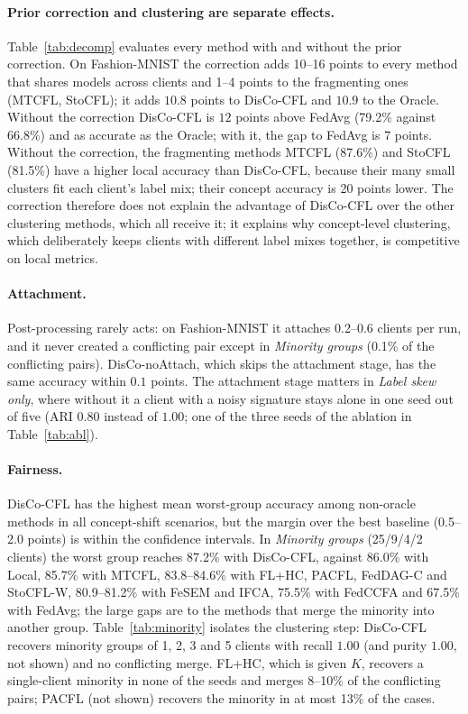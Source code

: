 \paragraph{Prior correction and clustering are separate effects.} Table~\ref{tab:decomp} evaluates every method with and without the prior correction. On Fashion-MNIST the correction adds 10--16 points to every method that shares models across clients and 1--4 points to the fragmenting ones (MTCFL, StoCFL); it adds $10.8$ points to DisCo-CFL and $10.9$ to the Oracle. Without the correction DisCo-CFL is $12$ points above FedAvg (79.2\% against 66.8\%) and as accurate as the Oracle; with it, the gap to FedAvg is $7$ points. Without the correction, the fragmenting methods MTCFL (87.6\%) and StoCFL (81.5\%) have a higher local accuracy than DisCo-CFL, because their many small clusters fit each client's label mix; their concept accuracy is 20 points lower. The correction therefore does not explain the advantage of DisCo-CFL over the other clustering methods, which all receive it; it explains why concept-level clustering, which deliberately keeps clients with different label mixes together, is competitive on local metrics.

\paragraph{Attachment.} Post-processing rarely acts: on Fashion-MNIST it attaches 0.2--0.6 clients per run, and it never created a conflicting pair except in \emph{Minority groups} (0.1\% of the conflicting pairs). DisCo-noAttach, which skips the attachment stage, has the same accuracy within $0.1$ points. The attachment stage matters in \emph{Label skew only}, where without it a client with a noisy signature stays alone in one seed out of five (ARI $0.80$ instead of $1.00$; one of the three seeds of the ablation in Table~\ref{tab:abl}).

\paragraph{Fairness.} DisCo-CFL has the highest mean worst-group accuracy among non-oracle methods in all concept-shift scenarios, but the margin over the best baseline (0.5--2.0 points) is within the confidence intervals. In \emph{Minority groups} (25/9/4/2 clients) the worst group reaches 87.2\% with DisCo-CFL, against 86.0\% with Local, 85.7\% with MTCFL, 83.8--84.6\% with FL+HC, PACFL, FedDAG-C and StoCFL-W, 80.9--81.2\% with FeSEM and IFCA, 75.5\% with FedCCFA and 67.5\% with FedAvg; the large gaps are to the methods that merge the minority into another group. Table~\ref{tab:minority} isolates the clustering step: DisCo-CFL recovers minority groups of 1, 2, 3 and 5 clients with recall $1.00$ (and purity $1.00$, not shown) and no conflicting merge. FL+HC, which is given $K$, recovers a single-client minority in none of the seeds and merges 8--10\% of the conflicting pairs; PACFL (not shown) recovers the minority in at most 13\% of the cases.

